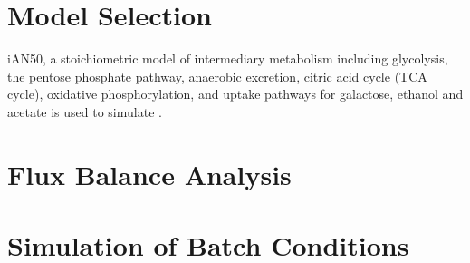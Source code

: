 \section{Model Selection}

iAN50, a stoichiometric model of intermediary metabolism including glycolysis, the pentose phosphate pathway, anaerobic excretion, citric acid cycle (TCA cycle), oxidative phosphorylation, and uptake pathways for galactose, ethanol and acetate is used to simulate \cite{nilsson2016metabolic}.

\section{Flux Balance Analysis}
\section{Simulation of Batch Conditions}
